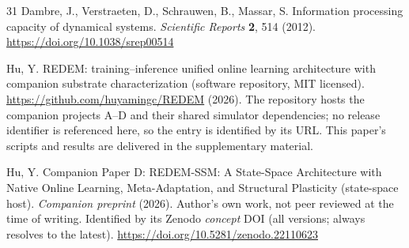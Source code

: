 \documentclass[preprint,12pt]{elsarticle}
\begin{document}
\begin{thebibliography}{31}
 Dambre, J., Verstraeten, D., Schrauwen, B., Massar, S.
Information processing capacity of dynamical systems. \emph{Scientific
Reports} \textbf{2}, 514 (2012). \url{https://doi.org/10.1038/srep00514}

 Hu, Y. REDEM: training--inference unified online learning
architecture with companion substrate characterization (software repository,
MIT licensed). \url{https://github.com/huyamingc/REDEM} (2026). The repository
hosts the companion projects A--D and their shared simulator dependencies;
no release identifier is referenced here, so the entry is identified by its
URL. This paper's scripts and results are delivered in the supplementary material.

 Hu, Y. Companion Paper D: REDEM-SSM: A State-Space
Architecture with Native Online Learning, Meta-Adaptation, and Structural
Plasticity (state-space host). \emph{Companion preprint} (2026). Author's own
work, not peer reviewed at the time of writing. Identified by its Zenodo
\emph{concept} DOI (all versions; always resolves to the latest).
\url{https://doi.org/10.5281/zenodo.22110623}

\end{thebibliography}
\end{document}
